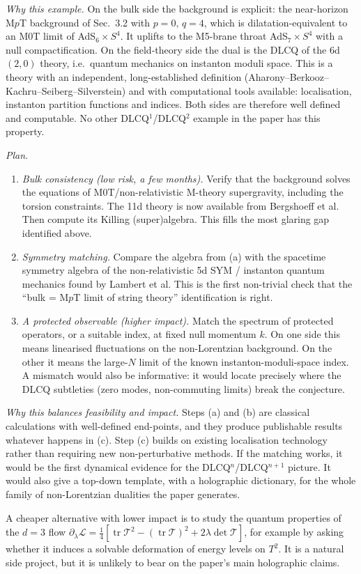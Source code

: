 \documentclass[11pt,a4paper]{article}
\begin{document}
\emph{Why this example.} On the bulk side the background is explicit: the near-horizon M$p$T background of Sec.~3.2 with
$p=0,\,q=4$, which is dilatation-equivalent to an M0T limit of AdS$_6\times S^4$. It uplifts to the
M5-brane throat AdS$_7\times S^4$ with a null compactification. On the field-theory side the dual
is the DLCQ of the 6d $(2,0)$ theory, i.e.\ quantum mechanics on instanton moduli space.
This is a theory with an independent, long-established definition (Aharony--Berkooz--Kachru--Seiberg--Silverstein)
and with computational tools available: localisation, instanton partition functions and indices.
Both sides are therefore well defined and computable. No other DLCQ$^1$/DLCQ$^2$ example
in the paper has this property.

\emph{Plan.}
\begin{enumerate}[label=(\alph*)]
\item \emph{Bulk consistency (low risk, a few months).} Verify that the background solves the
equations of M0T/non-relativistic M-theory supergravity, including the torsion constraints.
The 11d theory is now available from Bergshoeff et al. Then compute its Killing (super)algebra.
This fills the most glaring gap identified above.
\item \emph{Symmetry matching.} Compare the algebra from (a) with the spacetime symmetry
algebra of the non-relativistic 5d SYM / instanton quantum mechanics found by Lambert et al.
This is the first non-trivial check that the ``bulk = M$p$T limit of string theory''
identification is right.
\item \emph{A protected observable (higher impact).} Match the spectrum of protected
operators, or a suitable index, at fixed null momentum $k$. On one side this means linearised
fluctuations on the non-Lorentzian background. On the other it means the large-$N$ limit of
the known instanton-moduli-space index. A mismatch would also be informative: it would locate
precisely where the DLCQ subtleties (zero modes, non-commuting limits) break the conjecture.
\end{enumerate}

\emph{Why this balances feasibility and impact.} Steps (a) and (b) are classical
calculations with well-defined end-points, and they produce publishable results whatever
happens in (c). Step (c) builds on existing localisation technology rather than
requiring new non-perturbative methods. If the matching works, it would be the first dynamical
evidence for the DLCQ$^n$/DLCQ$^{n+1}$ picture. It would also give a top-down template, with
a holographic dictionary, for the whole family of non-Lorentzian dualities the paper generates.

A cheaper alternative with lower impact is to study the quantum properties of the
$d=3$ flow $\partial_\lambda\mathcal L=\tfrac14[\operatorname{tr}\mathcal T^2-(\operatorname{tr}\mathcal T)^2+2\lambda\det\mathcal T]$,
for example by asking whether it induces a solvable deformation of energy levels on $T^2$. It is
a natural side project, but it is unlikely to bear on the paper's main holographic claims.
\end{document}
